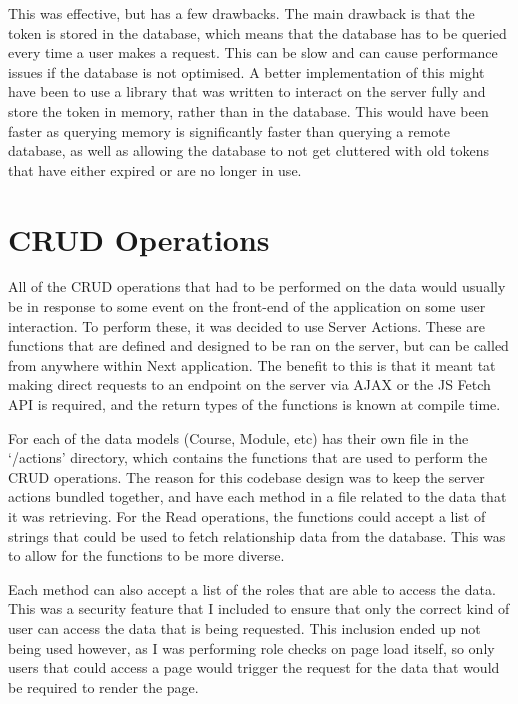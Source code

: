 \documentclass[12pt, a4paper,twoside]{report}
\theoremstyle{plain} %
\theoremstyle{definition} %
\numberwithin{equation}{chapter}
\begin{document}
This was effective, but has a few drawbacks. The main drawback is that the token
is stored in the database, which means that the database has to be queried every
time a user makes a request. This can be slow and can cause performance issues if
the database is not optimised. A better implementation of this might have been to
use a library that was written to interact on the server fully and store the token
in memory, rather than in the database. This would have been faster as querying
memory is significantly faster than querying a remote database, as well as allowing
the database to not get cluttered with old tokens that have either expired or are
no longer in use.

\section{CRUD Operations}\label{sec:crudoperations}

All of the CRUD operations that had to be performed on the data would usually be in
response to some event on the front-end of the application on some user interaction.
To perform these, it was decided to use Server Actions. These are functions that are
defined and designed to be ran on the server, but can be called from anywhere within
Next application. The benefit to this is that it meant tat making direct requests to
an endpoint on the server via AJAX or the JS Fetch API is required, and the return
types of the functions is known at compile time.

For each of the data models (Course, Module, etc) has their own file in the `/actions'
directory, which contains the functions that are used to perform the CRUD operations.
The reason for this codebase design was to keep the server actions bundled together,
and have each method in a file related to the data that it was retrieving. For the
Read operations, the functions could accept a list of strings that could be used to
fetch relationship data from the database. This was to allow for the functions to be
more diverse.

Each method can also accept a list of the roles that are able to access the data. This
was a security feature that I included to ensure that only the correct kind of user
can access the data that is being requested. This inclusion ended up not being used
however, as I was performing role checks on page load itself, so only users that could
access a page would trigger the request for the data that would be required to render
the page.
\end{document}
